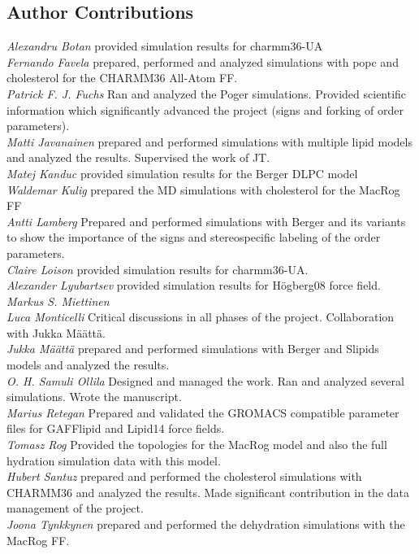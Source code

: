 \documentclass[journal=jacsat,manuscript=article]{achemso}
\begin{document}
\subsection{Author Contributions}
{\it Alexandru Botan} provided simulation results for charmm36-UA\\
{\it Fernando Favela} prepared, performed and analyzed simulations
with popc and cholesterol for the CHARMM36 All-Atom FF. \\
{\it Patrick F. J. Fuchs} Ran and analyzed the Poger simulations. Provided scientific information which significantly advanced the project (signs and forking of order parameters). \\
{\it Matti Javanainen} prepared and performed simulations with multiple lipid models and analyzed the results. Supervised the work of JT.\\
{\it Matej Kanduc} provided simulation results for the Berger DLPC model \\
{\it Waldemar Kulig} prepared the MD simulations with cholesterol for the MacRog FF \\
{\it Antti Lamberg} Prepared and performed simulations with Berger and its variants to show the importance of the signs and stereospecific labeling of the order parameters. \\
{\it Claire Loison} provided simulation results for charmm36-UA. \\
{\it Alexander Lyubartsev} provided simulation results for Högberg08 force field.\\
{\it Markus S. Miettinen}  \\
{\it Luca Monticelli} Critical discussions in all phases of the project. Collaboration with Jukka  M{\"a}{\"a}tt{\"a}. \\
{\it Jukka M{\"a}{\"a}tt{\"a}}  prepared and performed simulations with Berger and Slipids models and analyzed the results.\\
{\it O. H. Samuli Ollila} Designed and managed the work. Ran and analyzed several simulations. Wrote the manuscript.  \\
{\it Marius Retegan} Prepared and validated the GROMACS compatible parameter files for GAFFlipid and Lipid14 force fields.\\
{\it Tomasz Rog} Provided the topologies for the MacRog model and also the full hydration simulation data with this model. \\
{\it Hubert Santuz} prepared and performed the cholesterol simulations with CHARMM36 and analyzed the results. 
Made significant contribution in the data management of the project.\\
{\it Joona Tynkkynen} prepared and performed the dehydration simulations with the MacRog FF.\\




\end{document}
